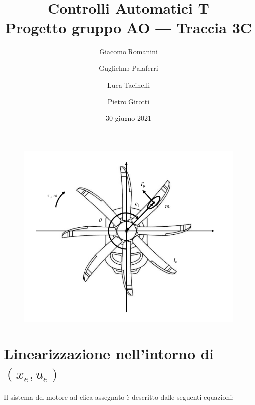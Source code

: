 \documentclass[12pt,italian]{article}
\title{
    Controlli Automatici T \\
    \large Progetto gruppo AO --- Traccia 3C\\
}
\author{
    Giacomo Romanini\\
    \and
    Guglielmo Palaferri\\
    \and
    Luca Tacinelli\\
    \and
    Pietro Girotti\\
}
\date{30 giugno 2021}
\begin{document}
\maketitle

\begin{figure}[h]
    \begin{center}
        \includegraphics[scale=0.5]{img/elica.png}
    \end{center}    
\end{figure}

\newpage

\section{Linearizzazione nell'intorno di $(x_e, u_e)$}
Il sistema del motore ad elica assegnato è descritto dalle seguenti equazioni: 
\end{document}
